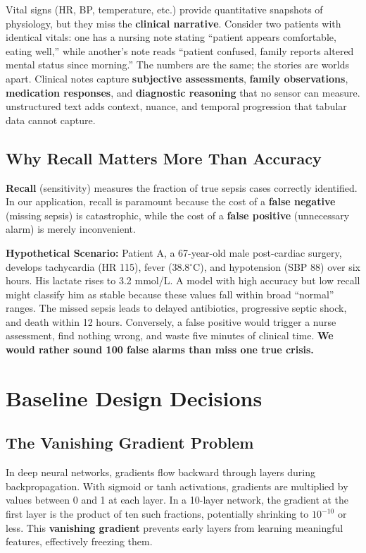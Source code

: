 \documentclass[11pt,a4paper]{article}
\begin{document}
Vital signs (HR, BP, temperature, etc.) provide quantitative snapshots of physiology, but they miss the \textbf{clinical narrative}. Consider two patients with identical vitals: one has a nursing note stating ``patient appears comfortable, eating well,'' while another's note reads ``patient confused, family reports altered mental status since morning.'' The numbers are the same; the stories are worlds apart. Clinical notes capture \textbf{subjective assessments}, \textbf{family observations}, \textbf{medication responses}, and \textbf{diagnostic reasoning} that no sensor can measure. unstructured text adds context, nuance, and temporal progression that tabular data cannot capture.

\subsection{Why Recall Matters More Than Accuracy}

\textbf{Recall} (sensitivity) measures the fraction of true sepsis cases correctly identified. In our application, recall is paramount because the cost of a \textbf{false negative} (missing sepsis) is catastrophic, while the cost of a \textbf{false positive} (unnecessary alarm) is merely inconvenient.

\textbf{Hypothetical Scenario:} Patient A, a 67-year-old male post-cardiac surgery, develops tachycardia (HR 115), fever (38.8$^\circ$C), and hypotension (SBP 88) over six hours. His lactate rises to 3.2 mmol/L. A model with high accuracy but low recall might classify him as stable because these values fall within broad ``normal'' ranges. The missed sepsis leads to delayed antibiotics, progressive septic shock, and death within 12 hours. Conversely, a false positive would trigger a nurse assessment, find nothing wrong, and waste five minutes of clinical time. \textbf{We would rather sound 100 false alarms than miss one true crisis.}

\section{Baseline Design Decisions}

\subsection{The Vanishing Gradient Problem}

In deep neural networks, gradients flow backward through layers during backpropagation. With sigmoid or tanh activations, gradients are multiplied by values between 0 and 1 at each layer. In a 10-layer network, the gradient at the first layer is the product of ten such fractions, potentially shrinking to $10^{-10}$ or less. This \textbf{vanishing gradient} prevents early layers from learning meaningful features, effectively freezing them.
\end{document}
